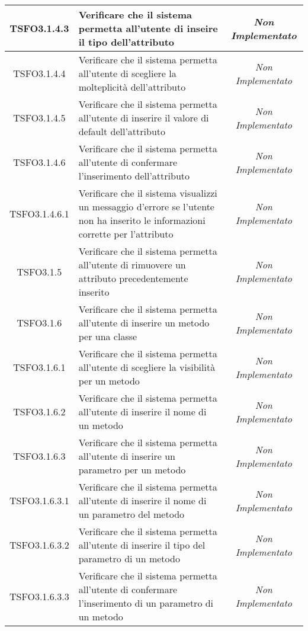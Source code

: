\begin{longtable}{|c|>{}m{8cm}|c|}
\hypertarget{TSFO3.1.4.3}{TSFO3.1.4.3} & Verificare che il sistema permetta all'utente di inseire il tipo dell'attributo & \textit{Non Implementato}\\ \hline
\hypertarget{TSFO3.1.4.4}{TSFO3.1.4.4} & Verificare che il sistema permetta all'utente di scegliere la molteplicità dell'attributo & \textit{Non Implementato}\\ \hline
\hypertarget{TSFO3.1.4.5}{TSFO3.1.4.5} & Verificare che il sistema permetta all'utente di inserire il valore di default dell'attributo & \textit{Non Implementato}\\ \hline
\hypertarget{TSFO3.1.4.6}{TSFO3.1.4.6} & Verificare che il sistema permetta all'utente di confermare l'inserimento dell'attributo & \textit{Non Implementato}\\ \hline
\hypertarget{TSFO3.1.4.6.1}{TSFO3.1.4.6.1} & Verificare che il sistema visualizzi un messaggio d'errore se l'utente non ha inserito le informazioni corrette per l'attributo & \textit{Non Implementato}\\ \hline
\hypertarget{TSFO3.1.5}{TSFO3.1.5} & Verificare che il sistema permetta all'utente di rimuovere un attributo precedentemente inserito & \textit{Non Implementato}\\ \hline
\hypertarget{TSFO3.1.6}{TSFO3.1.6} & Verificare che il sistema permetta all'utente di inserire un metodo per una classe & \textit{Non Implementato}\\ \hline
\hypertarget{TSFO3.1.6.1}{TSFO3.1.6.1} & Verificare che il sistema permetta all'utente di scegliere la visibilità per un metodo & \textit{Non Implementato}\\ \hline
\hypertarget{TSFO3.1.6.2}{TSFO3.1.6.2} & Verificare che il sistema permetta all'utente di inserire il nome di un metodo & \textit{Non Implementato}\\ \hline
\hypertarget{TSFO3.1.6.3}{TSFO3.1.6.3} & Verificare che il sistema permetta all'utente di inserire un parametro per un metodo & \textit{Non Implementato}\\ \hline
\hypertarget{TSFO3.1.6.3.1}{TSFO3.1.6.3.1} & Verificare che il sistema permetta all'utente di inserire il nome di un parametro del metodo & \textit{Non Implementato}\\ \hline
\hypertarget{TSFO3.1.6.3.2}{TSFO3.1.6.3.2} & Verificare che il sistema permetta all'utente di inserire il tipo del parametro di un metodo & \textit{Non Implementato}\\ \hline
\hypertarget{TSFO3.1.6.3.3}{TSFO3.1.6.3.3} & Verificare che il sistema permetta all'utente di confermare l'inserimento di un parametro di un metodo & \textit{Non Implementato}\\ \hline

\end{longtable}
